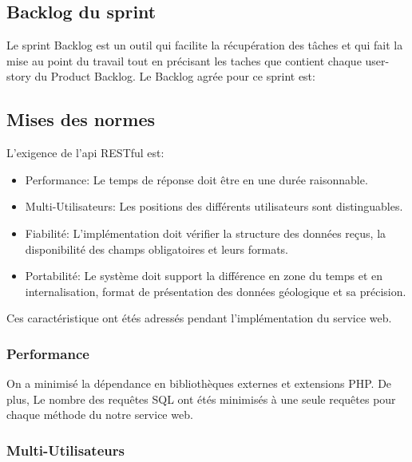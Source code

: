 \subsection{Backlog du sprint}
Le sprint Backlog est un outil qui facilite la récupération des tâches et qui fait
la mise au point du travail tout en précisant les taches que contient chaque
user-story du Product Backlog.
Le Backlog agrée pour ce sprint est:
\subsection{Mises des normes}

L'exigence de l'api RESTful est:
\begin{itemize}
    \item Performance: Le temps de réponse doit être en une durée raisonnable.
    \item Multi-Utilisateurs: Les positions des différents utilisateurs sont distinguables.
    \item Fiabilité: L'implémentation doit vérifier la structure des données reçus, la disponibilité des champs obligatoires et leurs formats.
    \item Portabilité: Le système doit support la différence en zone du temps et en internalisation, format de présentation des données géologique et sa précision.
\end{itemize}

Ces caractéristique ont étés adressés pendant l'implémentation du service web.

\subsubsection{Performance}

On a minimisé la dépendance en bibliothèques externes et extensions PHP.
De plus, Le nombre des requêtes SQL ont étés minimisés à une seule requêtes pour
chaque méthode du notre service web.

\subsubsection{Multi-Utilisateurs}

